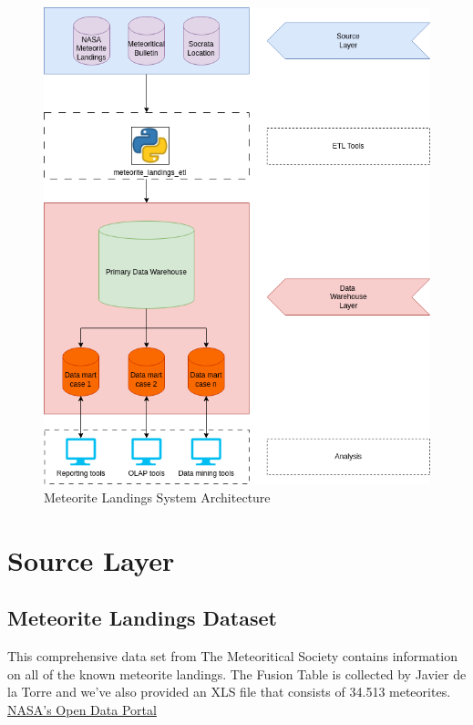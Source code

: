 \documentclass[conference]{IEEEtran}
\begin{document}
	\begin{figure}[htpb]
		\centering
		\includegraphics[width=\columnwidth]{images/system_architecture.png}
		\caption{Meteorite Landings System Architecture}
		\label{fig:Meteorite Landings System Architecture}
	\end{figure}
	
	\section{Source Layer}
	
	\subsection{Meteorite Landings Dataset}
	\label{subsec:meteorite landings data set}
	This comprehensive data set from The Meteoritical Society contains information on all of the known meteorite landings. The Fusion Table is collected by Javier de la Torre and we've also provided an XLS file that consists of 34.513 meteorites. \\
	\href{https://data.nasa.gov/Space-Science/Meteorite-Landings/gh4g-9sfh/about_data}{NASA's Open Data Portal}
	
\end{document}
